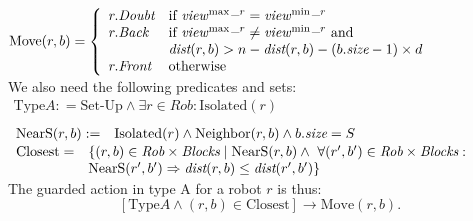 $\text{Move}(r, b) = \left\{ \begin{array}{l l}
    r.\textit{Doubt}  & \text{if } \mathit{view}^{\max\_r} = \mathit{view}^{\min\_r} \\
    r.\textit{Back} &\text{if } \mathit{view}^{\max\_r} \neq \mathit{view}^{\min\_r} 
\text{ and}\\
& \textit{dist}(r, b)> n - \textit{dist}(r, b)- (b.\textit{size} -1)\times d \\
   r.\textit{Front} &  \text{otherwise}
  \end{array} \right.$ \\
We also need the following predicates and sets: \\
$\begin{array}{l}\text{Type}A: = \text{Set-Up} \wedge \exists r \in \textit{Rob}: 
\textrm{Isolated}(r) \\ \end{array}$ \\
$\begin{array}{l l} \text{NearS}(r, b): = & \textrm{Isolated}(r) \wedge 
\textrm{Neighbor}(r, b) \wedge b.\textit{size} = S\\ \end{array}$ \\
$ \begin{array}{l l}\text{Closest}=&\{(r, b) \in 
\textit{Rob}\times \textit{Blocks} \mid  \text{NearS}(r, b)  \land \ 
\forall (r', b') \in \textit{Rob}\times \textit{Blocks}: \\ 
& \text{NearS}(r', b') \Rightarrow \textit{dist}(r, b) \leq \textit{dist}(r', b')
\} \end{array}$\\ 
The guarded action in type A for a robot $r$ is thus: 
$$[\text{Type}A \wedge (r, b) \in \text{Closest}]
\rightarrow \text{Move}(r, b).$$


